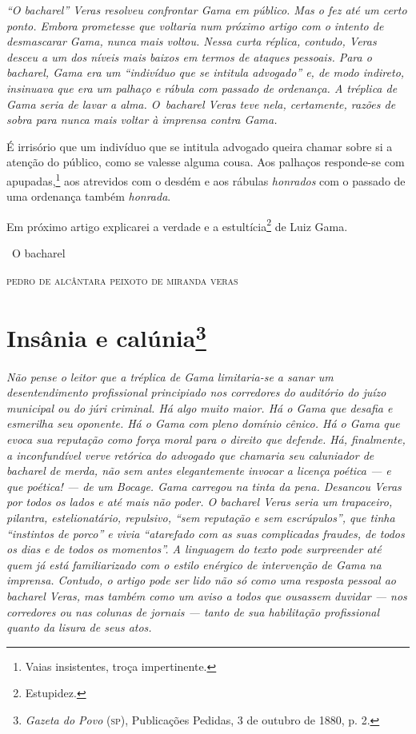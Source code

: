 \begin{resumo}
\emph{``O bacharel'' Veras resolveu confrontar Gama em público. Mas o fez
até um certo ponto. Embora prometesse que voltaria num próximo artigo
com o intento de desmascarar Gama, nunca mais voltou. Nessa curta
réplica, contudo, Veras desceu a um dos níveis mais baixos em termos de
ataques pessoais. Para o bacharel, Gama era um ``indivíduo que se
intitula advogado'' e, de modo indireto, insinuava que era um palhaço e
rábula com passado de ordenança. A tréplica de Gama seria de lavar a
alma. O~bacharel Veras teve nela, certamente, razões de sobra para nunca
mais voltar à imprensa contra Gama. }
\end{resumo}

É irrisório que um indivíduo que se intitula advogado queira chamar
sobre si a atenção do público, como se valesse alguma cousa. Aos
palhaços responde-se com apupadas,\footnote{Vaias insistentes, troça
  impertinente.} aos atrevidos com o desdém e aos rábulas
\emph{honrados} com o passado de uma ordenança também \emph{honrada}.

Em próximo artigo explicarei a verdade e a estultícia\footnote{
  Estupidez.} de Luiz Gama.\medskip

\hfill\ O bacharel

\hfill\textsc{pedro de alcântara peixoto de miranda veras}

\chapter{Insânia e calúnia\footnote{\emph{Gazeta do Povo}
  (\textsc{sp}), Publicações Pedidas, 3 de outubro de 1880, p. 2.}}

\begin{resumo}
\emph{Não pense o leitor que a tréplica de Gama limitaria-se a sanar um
desentendimento profissional principiado nos corredores do auditório do
juízo municipal ou do júri criminal. Há algo muito maior. Há o Gama
que desafia e esmerilha seu oponente. Há o Gama com pleno domínio
cênico. Há o Gama que evoca sua reputação como força moral para o
direito que defende. Há, finalmente, a inconfundível verve retórica do
advogado que chamaria seu caluniador de bacharel de merda, não sem antes
elegantemente invocar a licença poética --- e que poética! --- de um
Bocage. Gama carregou na tinta da pena. Desancou Veras por todos os
lados e até mais não poder. O bacharel Veras seria um trapaceiro,
pilantra, estelionatário, repulsivo, ``sem reputação e sem escrúpulos'',
que tinha ``instintos de porco'' e vivia ``atarefado com as suas
complicadas fraudes, de todos os dias e de todos os momentos''. A
linguagem do texto pode surpreender até quem já está familiarizado com o
estilo enérgico de intervenção de Gama na imprensa. Contudo, o artigo
pode ser lido não só como uma resposta pessoal ao bacharel Veras, mas
também como um aviso a todos que ousassem duvidar --- nos corredores ou
nas colunas de jornais --- tanto de sua habilitação profissional quanto
da lisura de seus atos.}
\end{resumo}

